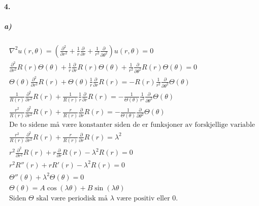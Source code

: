 \documentclass[11pt, A4paper,norsk]{article}
\begin{document}
		\paragraph{4.}
			\subparagraph{a)}
				\begin{gather*}
\nabla^2 u(r, \theta) = \left( \frac{\partial^2}{\partial r^2} + \frac{1}{r} \frac{\partial}{\partial r} + \frac{1}{r^2} \frac{\partial}{\partial \theta^2} \right) u(r, \theta) = 0 \\
\frac{\partial^2}{\partial r^2} R(r) \Theta(\theta) + \frac{1}{r} \frac{\partial}{\partial r} R(r) \Theta(\theta) + \frac{1}{r^2} \frac{\partial}{\partial \theta^2} R(r) \Theta(\theta) = 0 \\
\Theta(\theta) \frac{\partial^2}{\partial r^2} R(r) + \Theta(\theta) \frac{1}{r} \frac{\partial}{\partial r} R(r) = - R(r) \frac{1}{r^2} \frac{\partial}{\partial \theta^2} \Theta(\theta) \\
\frac{1}{R(r)} \frac{\partial^2}{\partial r^2} R(r) + \frac{1}{R(r)} \frac{1}{r} \frac{\partial}{\partial r} R(r) = - \frac{1}{\Theta(\theta)} \frac{1}{r^2} \frac{\partial}{\partial \theta^2} \Theta(\theta) \\
\frac{r^2}{R(r)} \frac{\partial^2}{\partial r^2} R(r) + \frac{r}{R(r)} \frac{\partial}{\partial r} R(r) = - \frac{1}{\Theta(\theta)} \frac{\partial}{\partial \theta^2} \Theta(\theta) \\
\text{De to sidene må være konstanter siden de er funksjoner av forskjellige variable} \\
\frac{r^2}{R(r)} \frac{\partial^2}{\partial r^2} R(r) + \frac{r}{R(r)} \frac{\partial}{\partial r} R(r) = \lambda^2 \\
r^2 \frac{\partial^2}{\partial r^2} R(r) + r \frac{\partial}{\partial r} R(r) - \lambda^2 R(r) = 0 \\
r^2 R''(r) + r R'(r) - \lambda^2 R(r) = 0 \\
\Theta''(\theta) + \lambda^2 \Theta(\theta) = 0 \\
\Theta(\theta) = A \cos(\lambda \theta) + B \sin(\lambda \theta) \\
\text{Siden $\Theta$ skal være periodisk må $\lambda$ være positiv eller 0.}
				\end{gather*}
\end{document}
